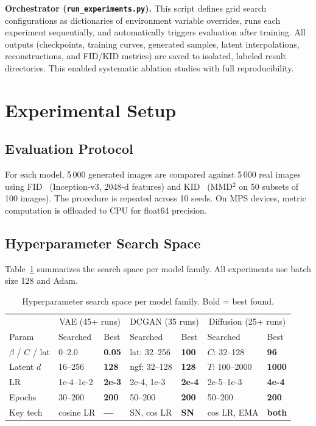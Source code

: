 \documentclass[runningheads]{llncs}
\begin{document}
\textbf{Orchestrator (\texttt{run\_experiments.py}).} This script defines grid search configurations as dictionaries of environment variable overrides, runs each experiment sequentially, and automatically triggers evaluation after training. All outputs (checkpoints, training curves, generated samples, latent interpolations, reconstructions, and FID/KID metrics) are saved to isolated, labeled result directories. This enabled systematic ablation studies with full reproducibility.

\section{Experimental Setup}\label{sec:setup}

\subsection{Evaluation Protocol}

For each model, 5\,000 generated images are compared against 5\,000 real images using FID~\cite{heusel2017} (Inception-v3, 2048-d features) and KID~\cite{binkowski2018} (MMD$^2$ on 50 subsets of 100 images). The procedure is repeated across 10 seeds. On MPS devices, metric computation is offloaded to CPU for float64 precision.

\subsection{Hyperparameter Search Space}

Table~\ref{tab:search_all} summarizes the search space per model family. All experiments use batch size 128 and Adam.

\begin{table}[htbp]
\caption{Hyperparameter search space per model family. Bold = best found.}\label{tab:search_all}
\centering\small
\begin{tabular}{l|ll|ll|ll}
\toprule
& \multicolumn{2}{c|}{VAE (45+ runs)} & \multicolumn{2}{c|}{DCGAN (35 runs)} & \multicolumn{2}{c}{Diffusion (25+ runs)} \\
Param & Searched & Best & Searched & Best & Searched & Best \\
\midrule
$\beta$ / $C$ / lat & 0--2.0 & \textbf{0.05} & lat: 32--256 & \textbf{100} & $C$: 32--128 & \textbf{96} \\
Latent $d$ & 16--256 & \textbf{128} & ngf: 32--128 & \textbf{128} & $T$: 100--2000 & \textbf{1000} \\
LR & 1e-4--1e-2 & \textbf{2e-3} & 2e-4, 1e-3 & \textbf{2e-4} & 2e-5--1e-3 & \textbf{4e-4} \\
Epochs & 30--200 & \textbf{200} & 50--200 & \textbf{200} & 50--200 & \textbf{200} \\
Key tech & cosine LR & \textbf{---} & SN, cos LR & \textbf{SN} & cos LR, EMA & \textbf{both} \\
\bottomrule
\end{tabular}
\end{table}
\end{document}
